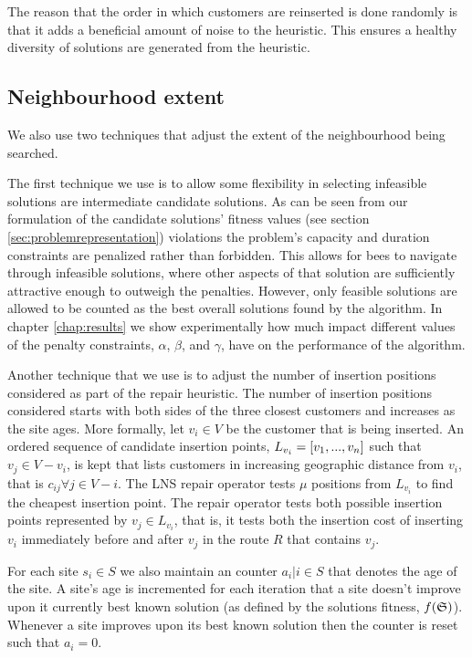 The reason that the order in which customers are reinserted is done randomly is that it adds a beneficial amount of noise to the heuristic. This ensures a healthy diversity of solutions are generated from the heuristic. 

\subsection{Neighbourhood extent}
\label{subsec:neighborhoodscope}

We also use two techniques that adjust the extent of the neighbourhood being searched. 

The first technique we use is to allow some flexibility in selecting infeasible solutions are intermediate candidate solutions. As can be seen from our formulation of the candidate solutions' fitness values (see section \ref{sec:problemrepresentation}) violations the problem's capacity and duration constraints are penalized rather than forbidden. This allows for bees to navigate through infeasible solutions, where other aspects of that solution are sufficiently attractive enough to outweigh the penalties. However, only feasible solutions are allowed to be counted as the best overall solutions found by the algorithm. In chapter \ref{chap:results} we show experimentally how much impact different values of the penalty constraints, $\alpha$, $\beta$, and $\gamma$, have on the performance of the algorithm.

Another technique that we use is to adjust the number of insertion positions considered as part of the repair heuristic. The number of insertion positions considered starts with both sides of the three closest customers and increases as the site ages. More formally, let $v_i \in V$ be the customer that is being inserted. An ordered sequence of candidate insertion points, $L_{v_i} = [v_1,...,v_n]$ such that $v_j \in V - v_i$, is kept that lists customers in increasing geographic distance from $v_i$, that is $c_{ij} \forall j \in V - i$. The LNS repair operator tests $\mu$ positions from $L_{v_i}$ to find the cheapest insertion point. The repair operator tests both possible insertion points represented by $v_j \in L_{v_i}$, that is, it tests both the insertion cost of inserting $v_i$ immediately before and after $v_j$ in the route $R$ that contains $v_j$. 

For each site $s_i \in S$ we also maintain an counter $a_i | i \in S$ that denotes the age of the site. A site's age is incremented for each iteration that a site doesn't improve upon it currently best known solution (as defined by the solutions fitness, $f(\mathfrak{S})$). Whenever a site improves upon its best known solution then the counter is reset such that $a_i = 0$.

